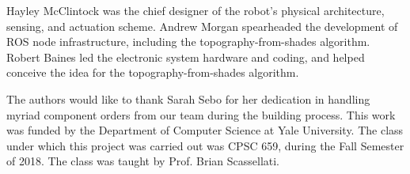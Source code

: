 \documentclass[letterpaper, 12 pt, conference]{ieeeconf}  %
\begin{document}
Hayley McClintock was the chief designer of the robot's physical architecture, sensing, and actuation scheme. Andrew Morgan spearheaded the development of ROS node infrastructure, including the topography-from-shades algorithm. Robert Baines led the electronic system hardware and coding, and helped conceive the idea for the topography-from-shades algorithm.


The authors would like to thank Sarah Sebo for her dedication in handling myriad component orders from our team during the building process. This work was funded by the Department of Computer Science at Yale University. The class under which this project was carried out was CPSC 659, during the Fall Semester of 2018. The class was taught by Prof. Brian Scassellati. 


\end{document}
